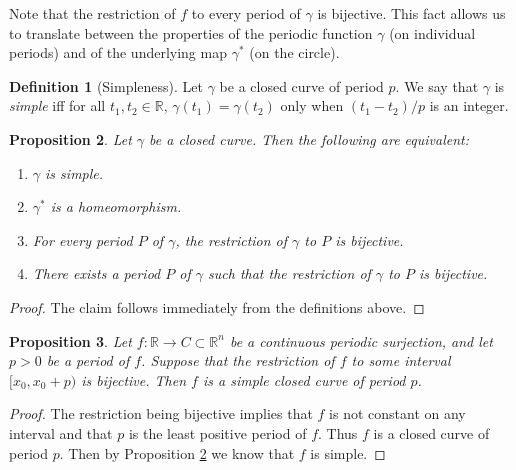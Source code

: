 \documentclass{amsart}
\newtheorem{proposition}{Proposition}[section]
\theoremstyle{definition}
\newtheorem{definition}[proposition]{Definition}
\theoremstyle{remark}
\begin{document}
Note that the restriction of $f$ to every period of $\gamma$ is bijective. This fact allows us to translate between
the properties of the periodic function $\gamma$
(on individual periods) and of the underlying map $\gamma^*$
(on the circle).

\begin{definition}[Simpleness]
    \label{def:simpleness}
    Let $\gamma$ be a closed curve of period $p$.
    We say that $\gamma$ is \emph{simple}
    iff for all $t_1,t_2\in\mathbb{R}$, $\gamma(t_1)=\gamma(t_2)$
    only when $(t_1-t_2)/p$ is an integer.
\end{definition}

\begin{proposition}
    \label{pro:simple_equiv}
    Let $\gamma$ be a closed curve.
    Then the following are equivalent:
    \begin{enumerate}
        \item $\gamma$ is simple.
        \item $\gamma^*$ is a homeomorphism.
        \item For every period $P$ of $\gamma$, the restriction
              of $\gamma$ to $P$ is bijective.
        \item There exists a period $P$ of $\gamma$ such that
              the restriction of $\gamma$ to $P$ is bijective.
    \end{enumerate}
\end{proposition}

\begin{proof}
    The claim follows immediately from the definitions above.
\end{proof}

\begin{proposition}
    \label{pro:simple_suf_cond}
    Let $f:\mathbb{R}\to C\subset\mathbb{R}^n$
    be a continuous periodic surjection,
    and let $p>0$ be a period of $f$. Suppose that
    the restriction of $f$ to some interval $[x_0,x_0+p)$
    is bijective.
    Then $f$ is a simple closed curve of period $p$.
\end{proposition}

\begin{proof}
    The restriction being bijective implies that
    $f$ is not constant on any interval and that
    $p$ is the least positive period of $f$. Thus $f$ is a 
    closed curve of period $p$. Then by Proposition
    \ref{pro:simple_equiv} we know that $f$ is simple.
\end{proof}
\end{document}
